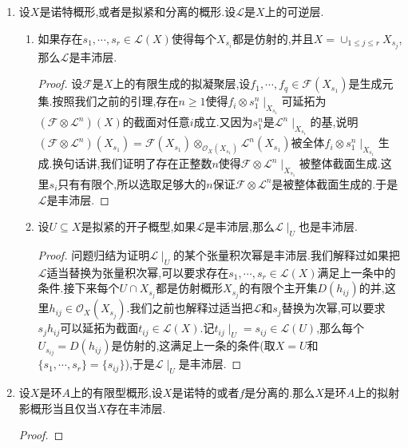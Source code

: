 \begin{enumerate}
\begin{proof}
		\qquad
		
		因为$s_i$已经在$X_{s_i}$上生成了$\mathscr{L}^n$,于是整体截面族$\{s_i^r,\forall i\}$生成了$\mathscr{L}^{nr}$,特别的$\{s_i^r,s_{ij}\}_{i,j}$生成了$\mathscr{L}^{nr}$.我们解释过这导致存在态射$\pi:X\to\mathrm{Proj}A[S_i,S_{ij}]$.取终端的仿射开子集$U_i=D_+(S_i)$,那么$X_{s_i}=\pi^{-1}(U_i)$,并且$\mathscr{O}(U_t)\to\mathscr{O}_X(X_{s_t})$就是$A[S_i,S_{ij},1/S_t]\to A[f_{ij}]$把$S_{ij}/S_i$映为$f_{ij}$,于是这是满同态,于是$\pi$可以分解为$X\to U=\cup_iU_i\subseteq\mathrm{Proj}A[S_i,S_{ij}]$,前者是闭嵌入,后者是开嵌入.于是$\pi$是嵌入,于是$\mathscr{L}^{nr}$是关于$A$的极丰沛可逆层.
	\end{proof}
	
	\item 设$X$是诺特概形,或者是拟紧和分离的概形.设$\mathscr{L}$是$X$上的可逆层.
	\begin{enumerate}
		\item 如果存在$s_1,\cdots,s_r\in\mathscr{L}(X)$使得每个$X_{s_i}$都是仿射的,并且$X=\cup_{1\le j\le r}X_{s_j}$,那么$\mathscr{L}$是丰沛层.
		\begin{proof}
			
			设$\mathscr{F}$是$X$上的有限生成的拟凝聚层,设$f_1,\cdots,f_q\in\mathscr{F}(X_{s_1})$是生成元集.按照我们之前的引理,存在$n\ge1$使得$f_i\otimes s_1^n\mid_{X_{s_1}}$可延拓为$(\mathscr{F}\otimes\mathscr{L}^n)(X)$的截面对任意$i$成立.又因为$s_1^n$是$\mathscr{L}^n\mid_{X_{s_1}}$的基,说明$(\mathscr{F}\otimes\mathscr{L}^n)(X_{s_1})=\mathscr{F}(X_{s_1})\otimes_{\mathscr{O}_X(X_{s_1})}\mathscr{L}^n(X_{s_1})$被全体$f_i\otimes s_1^n\mid_{X_{s_1}}$生成.换句话讲,我们证明了存在正整数$n$使得$\mathscr{F}\otimes\mathscr{L}^n\mid_{X_{s_1}}$被整体截面生成.这里$s_i$只有有限个,所以选取足够大的$n$保证$\mathscr{F}\otimes\mathscr{L}^n$是被整体截面生成的.于是$\mathscr{L}$是丰沛层.
		\end{proof}
		\item 设$U\subseteq X$是拟紧的开子概型,如果$\mathscr{L}$是丰沛层,那么$\mathscr{L}\mid_U$也是丰沛层.
		\begin{proof}
			
			问题归结为证明$\mathscr{L}\mid_U$的某个张量积次幂是丰沛层.我们解释过如果把$\mathscr{L}$适当替换为张量积次幂,可以要求存在$s_1,\cdots,s_r\in\mathscr{L}(X)$满足上一条中的条件.接下来每个$U\cap X_{s_j}$都是仿射概形$X_{s_j}$的有限个主开集$D(h_{ij})$的并,这里$h_{ij}\in\mathscr{O}_X(X_{s_j})$.我们之前也解释过适当把$\mathscr{L}$和$s_j$替换为次幂,可以要求$s_jh_{ij}$可以延拓为截面$t_{ij}\in\mathscr{L}(X)$.记$t_{ij}\mid_U=s_{ij}\in\mathscr{L}(U)$,那么每个$U_{s_{ij}}=D(h_{ij})$是仿射的,这满足上一条的条件(取$X=U$和$\{s_1,\cdots,s_r\}=\{s_{ij}\}$),于是$\mathscr{L}\mid_U$是丰沛层.
		\end{proof}
	\end{enumerate}
	\item 设$X$是环$A$上的有限型概形,设$X$是诺特的或者$f$是分离的.那么$X$是环$A$上的拟射影概形当且仅当$X$存在丰沛层.
	\begin{proof}
		

\end{proof}
\end{enumerate}
